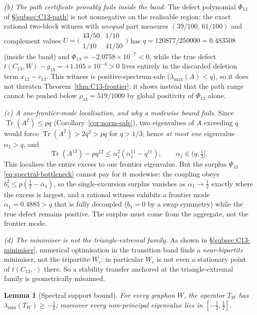 \documentclass[11pt]{article}
\newtheorem{lemma}[theorem]{Lemma}
\newcommand{\Tr}{\operatorname{Tr}}
\begin{document}
\emph{(b) The path certificate provably fails inside the band.}  The defect polynomial $\Phi_{13}$ of \S\ref{subsec:C13-path} is not nonnegative on the realisable region: the exact rational two-block witness with \emph{unequal} part measures $(39/100,\,61/100)$ and complement values $U=\bigl(\begin{smallmatrix}43/50&1/10\\1/10&41/50\end{smallmatrix}\bigr)$ has $q=120877/250000=0.483508$ (inside the band) and $\Phi_{13}=-2.0758\times10^{-7}<0$, while the true defect $t(C_{13},W)-g_{13}=+1.105\times10^{-4}>0$ lives entirely in the discarded deletion term $x_{12}-c_{13}$.  This witness is positive-spectrum-safe ($\lambda_{\max}(A)<q$), so it does not threaten Theorem~\ref{thm:C13-frontier}; it shows instead that the path range cannot be pushed below $\rho_{13}=519/1000$ by global positivity of $\Phi_{13}$ alone.

\emph{(c) A one-frontier-mode localisation, and why a modewise bound fails.}  Since $\Tr(A^2)\le pq$ (Corollary~\ref{cor:norm-safe}), two eigenvalues of $A$ exceeding $q$ would force $\Tr(A^2)>2q^2>pq$ for $q>1/3$; hence \emph{at most one} eigenvalue $\alpha_1>q$, and
\[
        \Tr(A^{13})-pq^{12}\le \alpha_1^2(\alpha_1^{11}-q^{11}),\qquad\alpha_1\in(q,\tfrac12].
\]
This localises the entire excess to one frontier eigenvalue.  But the surplus $\Psi_{13}$ \eqref{eq:spectral-bottleneck} cannot pay for it modewise: the coupling obeys $b_1^2\le p(\tfrac12-\alpha_1)$, so the single-excursion surplus vanishes as $\alpha_1\to\tfrac12$ exactly where the excess is largest, and a rational witness exhibits a frontier mode $\alpha_1=0.4885>q$ that is fully decoupled ($b_1=0$ by a swap symmetry) while the true defect remains positive.  The surplus must come from the aggregate, not the frontier mode.

\emph{(d) The minimiser is not the triangle-extremal family.}  As shown in \S\ref{subsec:C13-minimiser}, numerical optimisation in the transition band finds a \emph{near-bipartite} minimiser, not the tripartite $W_c$; in particular $W_c$ is not even a stationary point of $t(C_{13},\cdot)$ there.  So a stability transfer anchored at the triangle-extremal family is geometrically misaimed.

\begin{lemma}[Spectral support bound]\label{lem:lambda-min}
For every graphon $W$, the operator $T_W$ has $\lambda_{\min}(T_W)\ge-\tfrac12$; moreover every non-principal eigenvalue lies in $[-\tfrac12,\tfrac12]$.
\end{lemma}
\end{document}
